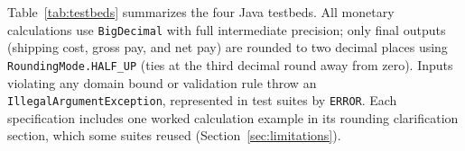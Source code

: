 \documentclass[acmsmall]{acmart}
\begin{document}
\begin{table}[t]
  \caption{Summary of reconstructed Java testbeds and seeded defect categories ($N=60$)}
  \label{tab:testbeds}
  \footnotesize
  \setlength{\tabcolsep}{3pt}
  \renewcommand{\arraystretch}{0.92}
\end{table}

Table~\ref{tab:testbeds} summarizes the four Java testbeds. All monetary calculations use \texttt{BigDecimal} with full intermediate precision; only final outputs (shipping cost, gross pay, and net pay) are rounded to two decimal places using \texttt{RoundingMode.HALF\_UP} (ties at the third decimal round away from zero). Inputs violating any domain bound or validation rule throw an \texttt{IllegalArgumentException}, represented in test suites by \texttt{ERROR}. Each specification includes one worked calculation example in its rounding clarification section, which some suites reused (Section~\ref{sec:limitations}).
\end{document}
